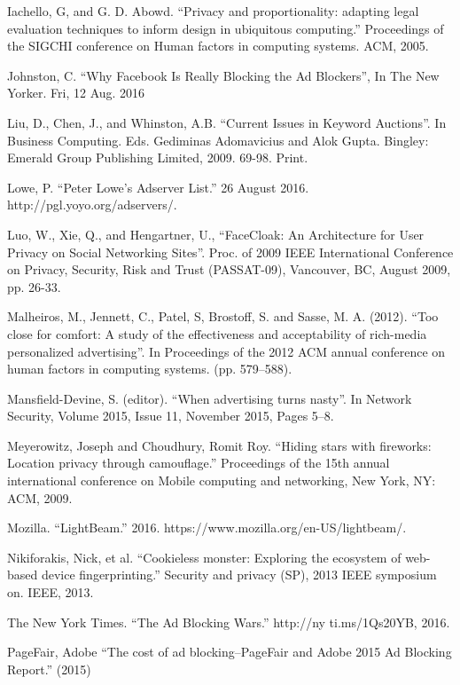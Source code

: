 \documentclass[conference]{IEEEtran}
\begin{document}
\begin{thebibliography}{99}
 Iachello, G, and G. D. Abowd. “Privacy and proportionality: adapting legal evaluation techniques to inform design in ubiquitous computing.” Proceedings of the SIGCHI conference on Human factors in computing systems. ACM, 2005.

 Johnston, C. “Why Facebook Is Really Blocking the Ad Blockers”, In The New Yorker. Fri, 12 Aug. 2016

 Liu, D., Chen, J., and Whinston, A.B. “Current Issues in Keyword Auctions”. In Business Computing. Eds. Gediminas Adomavicius and Alok Gupta. Bingley: Emerald Group Publishing Limited, 2009. 69-98. Print.

 Lowe, P. “Peter Lowe's Adserver List.” 26 August 2016. http://pgl.yoyo.org/adservers/.

 Luo, W., Xie, Q., and Hengartner, U., “FaceCloak: An Architecture for User Privacy on Social Networking Sites”. Proc. of 2009 IEEE International Conference on Privacy, Security, Risk and Trust (PASSAT-09), Vancouver, BC, August 2009, pp. 26-33.

 Malheiros, M., Jennett, C., Patel, S, Brostoff, S. and Sasse, M. A. (2012). “Too close for comfort: A study of the effectiveness and acceptability of rich-media personalized advertising”. In Proceedings of the 2012 ACM annual conference on human factors in computing systems. (pp. 579–588).

 Mansfield-Devine, S. (editor). “When advertising turns nasty”. In Network Security, Volume 2015, Issue 11, November 2015, Pages 5–8.

 Meyerowitz, Joseph and Choudhury, Romit Roy. “Hiding stars with fireworks: Location privacy through camouflage.” Proceedings of the 15th annual international conference on Mobile computing and networking, New York, NY: ACM, 2009.

 Mozilla. “LightBeam.” 2016. https://www.mozilla.org/en-US/lightbeam/.

 Nikiforakis, Nick, et al. “Cookieless monster: Exploring the ecosystem of web-based device fingerprinting.” Security and privacy (SP), 2013 IEEE symposium on. IEEE, 2013.

 The New York Times. “The Ad Blocking Wars.” http://ny ti.ms/1Qs20YB, 2016.

 PageFair, Adobe “The cost of ad blocking–PageFair and Adobe 2015 Ad Blocking Report.” (2015)


\end{thebibliography}
\end{document}
